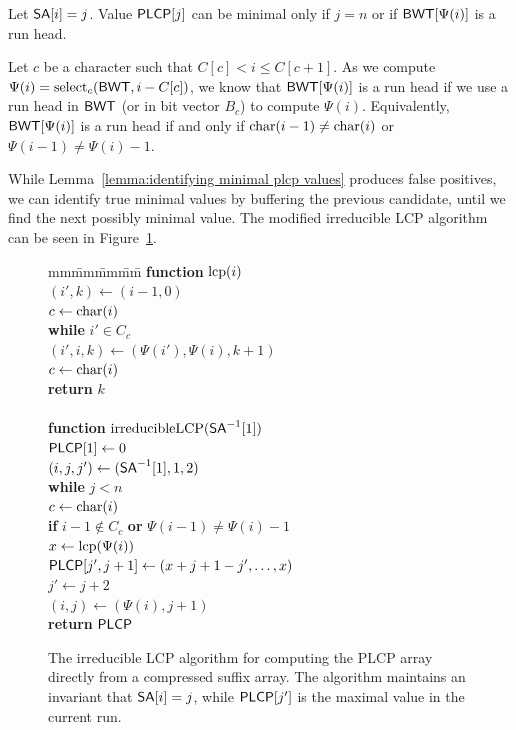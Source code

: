 \begin{lemma}\label{lemma:identifying minimal plcp values}
Let $\mathsf{SA}[i] = j$. Value $\mathsf{PLCP}[j]$ can be minimal only if $j = n$ or if $\mathsf{BWT}[\Psi(i)]$ is a run head.
\end{lemma}

Let $c$ be a character such that $C[c] < i \le C[c+1]$. As we compute $\Psi(i) = \operatorname{select}_{c}(\mathsf{BWT}, i - C[c])$, we know that $\mathsf{BWT}[\Psi(i)]$ is a run head if we use a run head in $\mathsf{BWT}$ (or in bit vector $B_{c}$) to compute $\Psi(i)$. Equivalently, $\mathsf{BWT}[\Psi(i)]$ is a run head if and only if $\operatorname{char}(i-1) \ne \operatorname{char}(i)$ or $\Psi(i-1) \ne \Psi(i) - 1$.

While Lemma~\ref{lemma:identifying minimal plcp values} produces false positives, we can identify true minimal values by buffering the previous candidate, until we find the next possibly minimal value. The modified irreducible LCP algorithm can be seen in Figure~\ref{fig:irreducible lcp algorithm}.

\begin{figure}
\begin{tabbing}
mm\=mm\=mm\=mm\= \kill
\> \textbf{function} $\operatorname{lcp}(i)$ \\
\> \> $(i', k) \leftarrow (i-1, 0)$ \\
\> \> $c \leftarrow \operatorname{char}(i)$ \\
\> \> \textbf{while} $i' \in C_{c}$ \\
\> \> \> $(i', i, k) \leftarrow (\Psi(i'), \Psi(i), k + 1)$ \\
\> \> \> $c \leftarrow \operatorname{char}(i)$ \\
\> \> \textbf{return} $k$ \\
\\
\> \textbf{function} $\operatorname{irreducibleLCP}(\mathsf{SA}^{-1}[1])$ \\
\> \> $\mathsf{PLCP}[1] \leftarrow 0$ \\
\> \> $(i, j, j') \leftarrow (\mathsf{SA}^{-1}[1], 1, 2)$ \\
\> \> \textbf{while} $j < n$ \\
\> \> \> $c \leftarrow \operatorname{char}(i)$ \\
\> \> \> \textbf{if} $i-1 \not\in C_{c}$ \textbf{or} $\Psi(i-1) \ne \Psi(i) - 1$ \\
\> \> \> \> $x \leftarrow \operatorname{lcp}(\Psi(i))$ \\
\> \> \> \> $\mathsf{PLCP}[j', j+1] \leftarrow (x + j+1 - j', \dotsc, x)$ \\
\> \> \> \> $j' \leftarrow j + 2$ \\
\> \> \> $(i, j) \leftarrow (\Psi(i), j + 1)$ \\
\> \> \textbf{return} $\mathsf{PLCP}$ 
\end{tabbing}

\caption{The irreducible LCP algorithm for computing the PLCP array directly from a compressed suffix array. The algorithm maintains an invariant that $\mathsf{SA}[i] = j$, while $\mathsf{PLCP}[j']$ is the maximal value in the current run.}\label{fig:irreducible lcp algorithm}
\end{figure}

